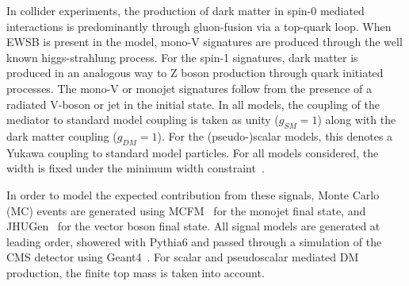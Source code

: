 In collider experiments, the production of dark matter in spin-0 mediated interactions is predominantly through gluon-fusion via a top-quark loop. 
When EWSB is present in the model, mono-V signatures are produced through the well known higgs-strahlung 
process. For the spin-1 signatures, dark matter is produced in an analogous way to Z boson production through quark initiated processes. The mono-V or monojet signatures follow 
from the presence of a radiated V-boson or jet in the initial state. In all models, the coupling of the mediator to standard model coupling is taken as unity 
($g_{SM}=1$) along with 
the dark matter coupling ($g_{DM}=1$). For the (pseudo-)scalar models, this denotes a Yukawa coupling to standard model particles. For all models considered, 
the width is fixed under the minimum width constraint~\cite{Harris:2014hga}.

In order to model the expected contribution from these signals, Monte Carlo (MC) events are generated using MCFM~\cite{mcfm}
for the monojet final state, and JHUGen~\cite{Anderson:2013afp} 
for the vector boson final state. All signal models are 
generated at leading order, showered with Pythia6 and passed through a 
simulation of the CMS detector using Geant4~\cite{geant4}. 
For scalar and pseudoscalar mediated DM production, the finite top mass is 
taken into account. 

